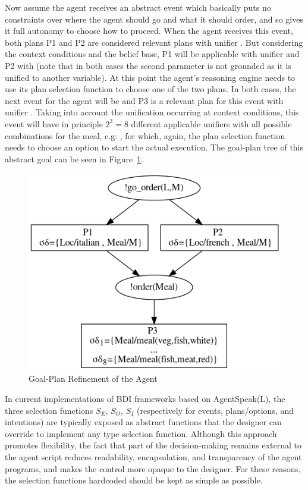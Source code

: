 Now assume the agent receives an abstract event  which basically puts no constraints over where the agent should go and what it should order, and so gives it full autonomy to choose how to proceed. When the agent receives this event, both plans P1 and P2 are considered relevant plans with unifier . But considering the context conditions and the belief base, P1 will be applicable with unifier  and P2 with  (note that in both cases the second parameter is not grounded as it is unified to another variable). At this point the agent's reasoning engine needs to use its plan selection function to choose one of the two plans. In both cases, the next event for the agent will be  and P3 is a relevant plan for this event with unifier .  Taking into account the unification occurring at context conditions, this event will have in principle $2^3 = 8$ different applicable unifiers with all possible combinations for the meal, e.g: , for which, again, the plan selection function needs to choose an option to start the actual execution. The goal-plan tree of this abstract goal can be seen in Figure~\ref{fig:gp-tree}.

\begin{figure}[!t]
  \centering
  \includegraphics[width=0.70\linewidth]{ch3/outfile.png}
  \caption{Goal-Plan Refinement of the Agent}
  \label{fig:gp-tree}
\end{figure}

In current implementations of BDI frameworks based on AgentSpeak(L), the three selection functions $S_E$, $S_O$, $S_I$ (respectively for events, plans/options, and intentions) are typically exposed as abstract functions that the designer can override to implement any type selection function. Although this approach promotes flexibility, the fact that part of the decision-making remains external to the agent script reduces readability, encapsulation, and transparency of the agent programs, and makes the control more opaque to the designer. For these reasons, the selection functions hardcoded should be kept as simple as possible.

